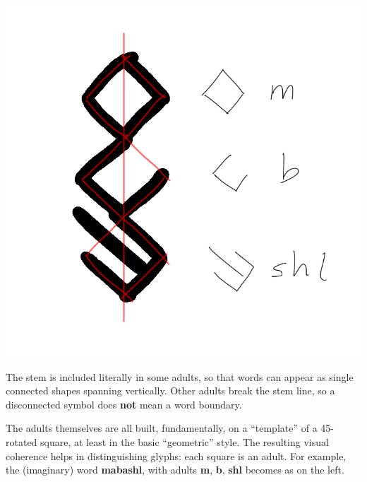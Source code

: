\documentclass[10pt,oneside]{memoir}
\begin{document}
\vfill

\begin{minipage}{0.45\textwidth}
     \centering
    \includegraphics{mabashl}
\end{minipage}
\hfill
\begin{minipage}{0.5\textwidth}
The stem is included literally in some adults, so that words can appear as single connected shapes spanning vertically. Other adults break the stem line, so a disconnected symbol does \textbf{not} mean a word boundary. 

The adults themselves are all built, fundamentally, on a ``template'' of a 45\degree-rotated square, at least in the basic ``geometric'' style. The resulting visual coherence helps in distinguishing glyphs: each square is an adult. For example, the (imaginary) word \textbf{mabashl}, with adults \textbf{m}, \textbf{b}, \textbf{shl} becomes as on the left.

\end{minipage}

\vfill
\end{document}
